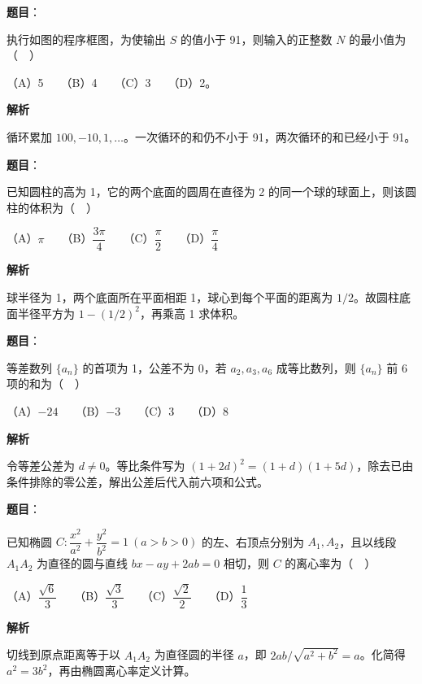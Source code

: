 \begin{answer}

\textbf{题目}：

执行如图的程序框图，为使输出 \(S\) 的值小于 91，则输入的正整数 \(N\) 的最小值为（　）
\nopagebreak[4]
\begin{center}\end{center}
\nopagebreak[4]
   （A）5　　（B）4　　（C）3　　（D）2。

\textbf{解析}

循环累加 \(100,-10,1,\ldots\)。一次循环的和仍不小于 91，两次循环的和已经小于 91。


\end{answer}
\begin{answer}

\textbf{题目}：

已知圆柱的高为 1，它的两个底面的圆周在直径为 2 的同一个球的球面上，则该圆柱的体积为（　）

   （A）\(\pi\)　　（B）\(\dfrac{3\pi}{4}\)　　（C）\(\dfrac\pi2\)　　（D）\(\dfrac\pi4\)

\textbf{解析}

球半径为 1，两个底面所在平面相距 1，球心到每个平面的距离为 \(1/2\)。故圆柱底面半径平方为 \(1-(1/2)^2\)，再乘高 1 求体积。


\end{answer}
\begin{answer}

\textbf{题目}：

等差数列 \(\{a_n\}\) 的首项为 1，公差不为 0，若 \(a_2,a_3,a_6\) 成等比数列，则 \(\{a_n\}\) 前 6 项的和为（　）

   （A）\(-24\)　　（B）\(-3\)　　（C）3　　（D）8

\textbf{解析}

令等差公差为 \(d\ne0\)。等比条件写为 \((1+2d)^2=(1+d)(1+5d)\)，除去已由条件排除的零公差，解出公差后代入前六项和公式。


\end{answer}
\begin{answer}

\textbf{题目}：

已知椭圆 \(C:\dfrac{x^2}{a^2}+\dfrac{y^2}{b^2}=1\ (a>b>0)\) 的左、右顶点分别为 \(A_1,A_2\)，且以线段 \(A_1A_2\) 为直径的圆与直线 \(bx-ay+2ab=0\) 相切，则 \(C\) 的离心率为（　）

   （A）\(\dfrac{\sqrt6}{3}\)　　（B）\(\dfrac{\sqrt3}{3}\)　　（C）\(\dfrac{\sqrt2}{2}\)　　（D）\(\dfrac13\)

\textbf{解析}

切线到原点距离等于以 \(A_1A_2\) 为直径圆的半径 \(a\)，即 \(2ab/\sqrt{a^2+b^2}=a\)。化简得 \(a^2=3b^2\)，再由椭圆离心率定义计算。


\end{answer}
